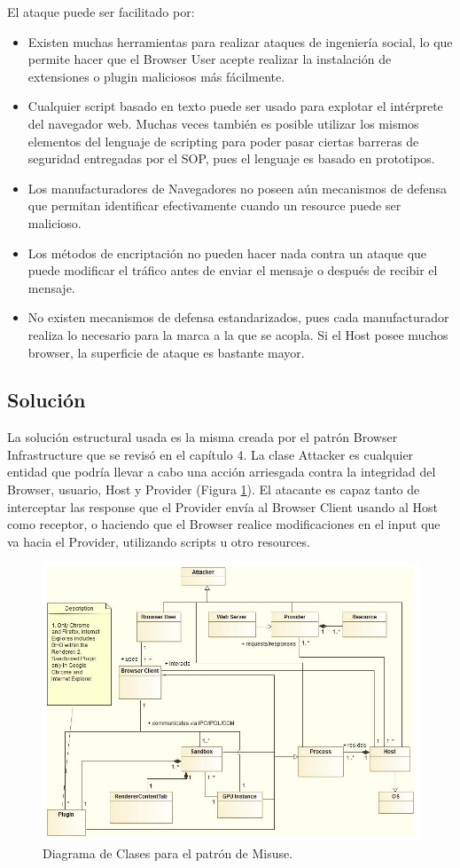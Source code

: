 El ataque puede ser facilitado por:
\begin{itemize}
	\item Existen muchas herramientas para realizar ataques de ingeniería social, lo que permite hacer que el Browser User acepte realizar la instalación de extensiones o plugin maliciosos más fácilmente.
	\item Cualquier script basado en texto puede ser usado para explotar el intérprete del navegador web. Muchas veces también es posible utilizar los mismos elementos del lenguaje de scripting para poder pasar ciertas barreras de seguridad entregadas por el SOP, pues el lenguaje es basado en prototipos. 
	\item Los manufacturadores de Navegadores no poseen aún mecanismos de defensa que permitan identificar efectivamente cuando un resource puede ser malicioso.
	\item Los métodos de encriptación no pueden hacer nada contra un ataque que puede modificar el tráfico antes de enviar el mensaje o después de recibir el mensaje.
	\item No existen mecanismos de defensa estandarizados, pues cada manufacturador realiza lo necesario para la marca a la que se acopla. Si el Host posee muchos browser, la superficie de ataque es bastante mayor.
\end{itemize}
\subsection{Solución}
La solución estructural usada es la misma creada por el patrón Browser Infrastructure que se revisó en el capítulo 4. La clase Attacker es cualquier entidad que podría llevar a cabo una acción arriesgada contra la integridad del Browser, usuario, Host y Provider (Figura \ref{fig:BIMisuse}). El atacante es capaz tanto de interceptar las response que el Provider envía al Browser Client usando al Host como receptor, o haciendo que el Browser realice modificaciones en el input que va hacia el Provider, utilizando scripts u otro resources.
\begin{figure}[h!t]
	        \centering
	        \includegraphics[scale=0.45]{figures/chap5/patronMisuse.jpg}
	        \caption{Diagrama de Clases para el patrón de Misuse.}
	        \label{fig:BIMisuse}
    \end{figure}

